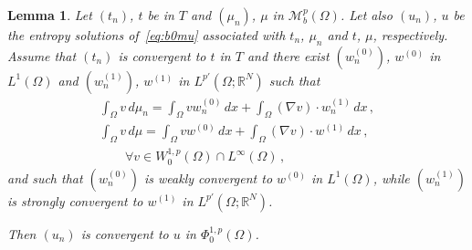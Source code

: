 \documentclass[twoside,reqno]{amsart}
\numberwithin{equation}{section}
\newtheorem{lem}[thm]{Lemma}
\theoremstyle{definition}
\newcommand{\R}{\mathbb{R}}
\begin{document}
%
\begin{lem}
\label{lem:cont}
Let $(t_n)$, $t$ be in $T$ and $(\mu_n)$, $\mu$ in 
$\mathcal{M}_b^p(\Omega)$.
Let also $(u_n)$, $u$ be the entropy solutions of~\eqref{eq:b0mu} 
associated with $t_n$, $\mu_n$ and $t$, $\mu$, respectively.
Assume that $(t_n)$ is convergent to $t$ in $T$ and there exist 
$(w_n^{(0)})$, $w^{(0)}$ in $L^1(\Omega)$ and 
$(w_n^{(1)})$, $w^{(1)}$ in $L^{p'}(\Omega;\R^N)$ such that
\begin{multline*}
\int_\Omega v\,d\mu_n 
= \int_\Omega v w_n^{(0)}\,dx 
+\int_\Omega (\nabla v)\cdot w_n^{(1)}\,dx\,,\\ 
\int_\Omega v\,d\mu 
= \int_\Omega v w^{(0)}\,dx 
+\int_\Omega (\nabla v)\cdot w^{(1)}\,dx\,,\\ 
\qquad\forall v\in W^{1,p}_0(\Omega)\cap L^\infty(\Omega)\,,
\end{multline*}
and such that $(w_n^{(0)})$ is weakly convergent to
$w^{(0)}$ in $L^1(\Omega)$, while $(w_n^{(1)})$ is strongly
convergent to $w^{(1)}$ in $L^{p'}(\Omega;\R^N)$.
\par
Then $(u_n)$ is convergent to $u$ in $\Phi^{1,p}_0(\Omega)$.
\end{lem}
%
\end{document}

